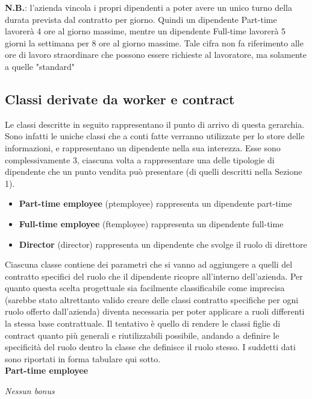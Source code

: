 \documentclass[a4paper,10pt]{article}
\begin{document}
\textbf{N.B.}: l'azienda vincola i propri dipendenti a poter avere un unico turno della durata prevista dal contratto per giorno. Quindi un dipendente Part-time lavorerà 4 ore al giorno massime, mentre un dipendente Full-time lavorerà 5 giorni la settimana per 8 ore al giorno massime. Tale cifra non fa riferimento alle ore di lavoro straordinare che possono essere richieste al lavoratore, ma solamente a quelle "standard"\\ 

\subsection{Classi derivate da worker e contract}
Le classi descritte in seguito rappresentano il punto di arrivo di questa gerarchia. Sono infatti le uniche classi che a conti fatte verranno utilizzate per lo store delle informazioni, e rappresentano un dipendente nella sua interezza.
Esse sono complessivamente 3, ciascuna volta a rappresentare una delle tipologie di dipendente che un punto vendita può presentare (di quelli descritti nella Sezione 1).
\begin{itemize}
\item \textbf{Part-time employee} (ptemployee) rappresenta un dipendente part-time
\item \textbf{Full-time employee} (ftemployee) rappresenta un dipendente full-time
\item \textbf{Director} (director) rappresenta un dipendente che svolge il ruolo di direttore
\end{itemize}

Ciascuna classe contiene dei parametri che si vanno ad aggiungere a quelli del contratto specifici del ruolo che il dipendente ricopre all'interno dell'azienda. Per quanto questa scelta progettuale sia facilmente classificabile come imprecisa (sarebbe stato altrettanto valido creare delle classi contratto specifiche per ogni ruolo offerto dall'azienda) diventa necessaria per poter applicare a ruoli differenti la stessa base contrattuale. Il tentativo è quello di rendere le classi figlie di contract quanto più generali e riutilizzabili possibile, andando a definire le specificità del ruolo dentro la classe che definisce il ruolo stesso. 
I suddetti dati sono riportati in forma tabulare qui sotto. \\

\textbf{Part-time employee}

\begin{center}
\textit{Nessun bonus}
\end{center} 
\end{document}
